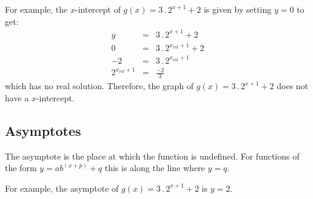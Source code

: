 For example, the $x$-intercept of $g(x)=3\,.\, 2^{x+1} + 2$ is given by setting $y=0$ to get:
\begin{eqnarray*}
y&=&3\,.\, 2^{x+1} + 2\\
0&=&3\,.\, 2^{x_{int}+1} + 2\\
-2&=&3\,.\, 2^{x_{int}+1}\\
2^{x_{int}+1}&=&\frac{-2}{3}
\end{eqnarray*}
which has no real solution. Therefore, the graph of $g(x)=3\,.\, 2^{x+1} + 2$ does not have a $x$-intercept.


\subsection{Asymptotes}
The asymptote is the place at which the function is undefined.  For functions of the form $y=ab^{(x+p)} + q$ this is along the line where $y = q$.

For example, the asymptote of $g(x)=3\,.\, 2^{x+1} + 2$ is $y = 2$.


